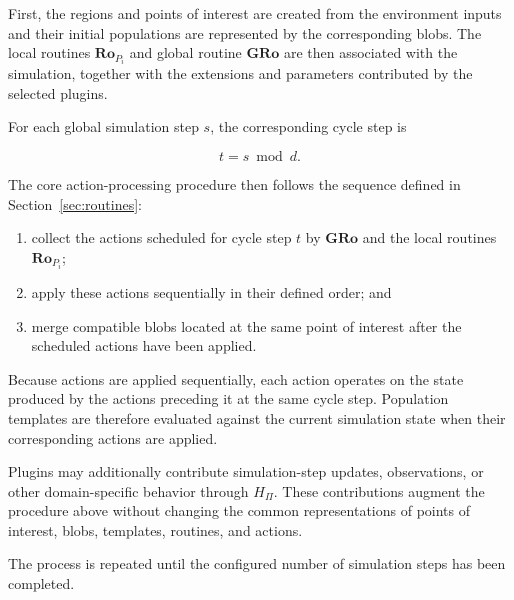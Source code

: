 First, the regions and points of interest are created from the environment inputs and their initial populations are represented by the corresponding blobs. The local routines $\bm{Ro}_{P_i}$ and global routine $\bm{GRo}$ are then associated with the simulation, together with the extensions and parameters contributed by the selected plugins. 

For each global simulation step $s$, the corresponding cycle step is 

\[ t=s\bmod d. \] 

The core action-processing procedure then follows the sequence defined in Section~\ref{sec:routines}: 

\begin{enumerate} 
\item collect the actions scheduled for cycle step $t$ by $\bm{GRo}$ and the local routines $\bm{Ro}_{P_i}$; 
\item apply these actions sequentially in their defined order; and 
\item merge compatible blobs located at the same point of interest after the scheduled actions have been applied. 
\end{enumerate} 

Because actions are applied sequentially, each action operates on the state produced by the actions preceding it at the same cycle step. Population templates are therefore evaluated against the current simulation state when their corresponding actions are applied. 

Plugins may additionally contribute simulation-step updates, observations, or other domain-specific behavior through $H_{\Pi}$. These contributions augment the procedure above without changing the common representations of points of interest, blobs, templates, routines, and actions. 

The process is repeated until the configured number of simulation steps has been completed.

